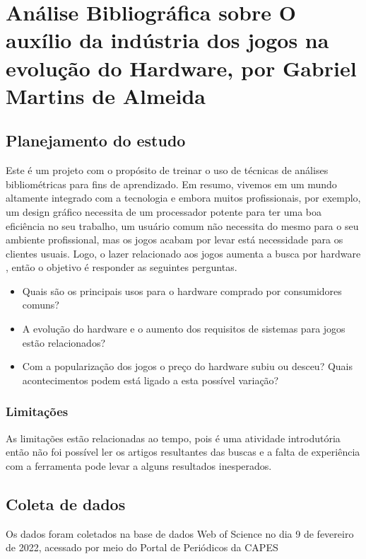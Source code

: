\chapter{Análise Bibliográfica sobre O auxílio da indústria dos jogos na evolução do Hardware, por Gabriel Martins de Almeida}

\section{Planejamento do estudo}

Este é um projeto com o propósito de treinar o uso de técnicas de análises bibliométricas para fins de aprendizado. Em resumo, vivemos em um mundo altamente integrado com a tecnologia e embora muitos profissionais, por exemplo, um design gráfico necessita de um processador potente para ter uma boa eficiência no seu trabalho, um usuário comum não necessita do mesmo para o seu ambiente profissional, mas os jogos acabam por levar está necessidade para os clientes usuais. Logo, o lazer relacionado aos jogos aumenta a busca por hardware , então o objetivo é responder as seguintes perguntas.

\begin{itemize}
    \item Quais são os principais usos para o hardware comprado por consumidores comuns?
    \item A evolução do hardware e o aumento dos requisitos de sistemas para jogos estão relacionados?
    \item Com a popularização dos jogos o preço do hardware subiu ou desceu? Quais acontecimentos podem está ligado a esta possível variação?
\end{itemize}

\subsection{Limitações} As limitações estão relacionadas ao tempo, pois é uma atividade introdutória então não foi possível ler os artigos resultantes das buscas e a falta de experiência com a ferramenta pode levar a alguns resultados inesperados.

\section{Coleta de dados} 
Os dados foram coletados na base de dados Web of Science no dia 9 de fevereiro de 2022, acessado por meio do Portal de Periódicos da CAPES

